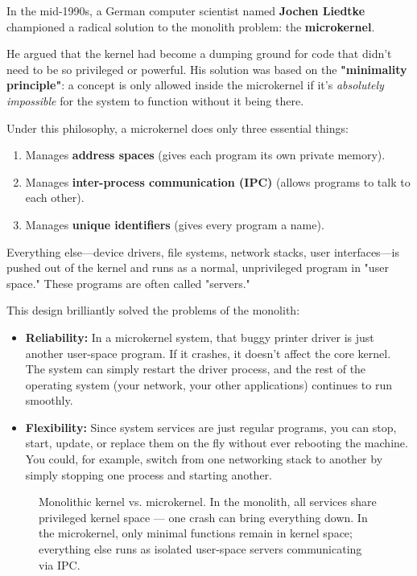 In the mid-1990s, a German computer scientist named \textbf{Jochen Liedtke} championed a radical solution to the monolith problem: the \textbf{microkernel}.

He argued that the kernel had become a dumping ground for code that didn't need to be so privileged or powerful. His solution was based on the \textbf{"minimality principle"}: a concept is only allowed inside the microkernel if it's \textit{absolutely impossible} for the system to function without it being there.

Under this philosophy, a microkernel does only three essential things:
\begin{enumerate}
\item Manages \textbf{address spaces} (gives each program its own private memory).
\item Manages \textbf{inter-process communication (IPC)} (allows programs to talk to each other).
\item Manages \textbf{unique identifiers} (gives every program a name).
\end{enumerate}

Everything else---device drivers, file systems, network stacks, user interfaces---is pushed out of the kernel and runs as a normal, unprivileged program in "user space." These programs are often called "servers."

This design brilliantly solved the problems of the monolith:

\begin{itemize}
\item \textbf{Reliability:} In a microkernel system, that buggy printer driver is just another user-space program. If it crashes, it doesn't affect the core kernel. The system can simply restart the driver process, and the rest of the operating system (your network, your other applications) continues to run smoothly.
\item \textbf{Flexibility:} Since system services are just regular programs, you can stop, start, update, or replace them on the fly without ever rebooting the machine. You could, for example, switch from one networking stack to another by simply stopping one process and starting another.
\end{itemize}
\begin{figure}[htbp]
\centering

\caption{Monolithic kernel vs. microkernel. In the monolith, all services share privileged kernel space --- one crash can bring everything down. In the microkernel, only minimal functions remain in kernel space; everything else runs as isolated user-space servers communicating via IPC.}
\label{fig:2_1}
\end{figure}



